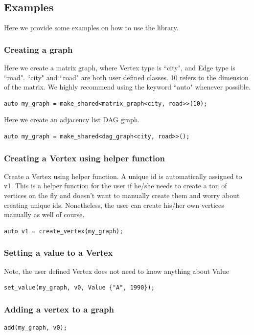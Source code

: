 \documentclass{article}
\begin{document}
\subsection{Examples}
Here we provide some examples on how to use the library. 
\subsubsection{Creating a graph}
Here we create a matrix graph, where Vertex type is ``city", and Edge type is ``road". ``city" and ``road" are both user defined classes. 10 refers to the dimension of the matrix. We highly recommend using the keyword ``auto" whenever possible.
\begin{lstlisting}
auto my_graph = make_shared<matrix_graph<city, road>>(10);
\end{lstlisting}
Here we create an adjacency list DAG graph.
\begin{lstlisting}
auto my_graph = make_shared<dag_graph<city, road>>();
\end{lstlisting}

\subsubsection{Creating a Vertex using helper function}
Create a Vertex using helper function. A unique id is automatically assigned to v1. This is a helper function for the user if he/she needs to create a ton of vertices on the fly and doesn't want to manually create them and worry about creating unique ids. Nonetheless, the user can create his/her own vertices manually as well of course. 
\begin{lstlisting}
auto v1 = create_vertex(my_graph);
\end{lstlisting}

\subsubsection{Setting a value to a Vertex}
Note, the user defined Vertex does not need to know anything about Value
\begin{lstlisting}
set_value(my_graph, v0, Value {"A", 1990});
\end{lstlisting}

\subsubsection{Adding a vertex to a graph}
\begin{lstlisting}
add(my_graph, v0);
\end{lstlisting}
\end{document}
